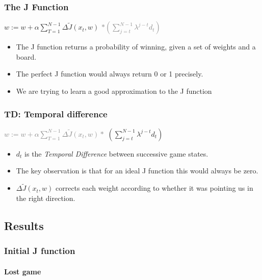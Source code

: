 \documentclass[10pt]{beamer}
\begin{document}
    \begin{frame}
      \frametitle{The J Function}
      \begin{center} $\displaystyle w := w + \alpha \sum_{T=1}^{N-1} \Delta \tilde{J}(x_t,w)$  \textcolor{gray}{$ * ( \sum _{j=t} ^{N-1} \lambda ^{j-t} d_t )$} \end{center}
      \begin{itemize}
        \item<1-> The J function returns a probability of winning, given a set of weights and a board.
        \item<1-> The perfect J function would always return 0 or 1 precisely.
        \item<1-> We are trying to learn a good approximation to the J function
      \end{itemize}
    \end{frame}
    
    \begin{frame}
      \frametitle{TD: Temporal difference}
      \begin{center} \textcolor{gray}{$\displaystyle w := w + \alpha \sum_{T=1}^{N-1} \Delta \tilde{J}(x_t,w) *$}  $( \sum _{j=t} ^{N-1} \lambda ^{j-t} d_t )$ \end{center}
      \begin{itemize}
        \item<1-> $d_t$ is the \emph{Temporal Difference} between successive game states.
        \item<1-> The key observation is that for an ideal J function this would always be zero.
        \item<1-> $\Delta \tilde{J}(x_t,w)$ corrects each weight according to whether it was pointing us in the right direction.
      \end{itemize}
    \end{frame}

\subsection{Results}



\begin{frame}
  \frametitle{Initial J function}
  \framesubtitle{Lost game}
  \begin{center}  \end{center}
\end{frame}
\end{document}
